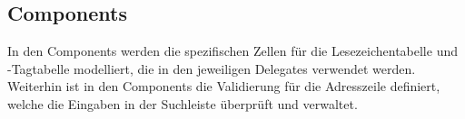 
\subsection{Components}
In den Components werden die spezifischen Zellen für die Lesezeichentabelle und \SEARCH-Tagtabelle modelliert, die in den jeweiligen Delegates verwendet werden. Weiterhin ist in den Components die Validierung für die Adresszeile definiert, welche die Eingaben in der Suchleiste überprüft und verwaltet.